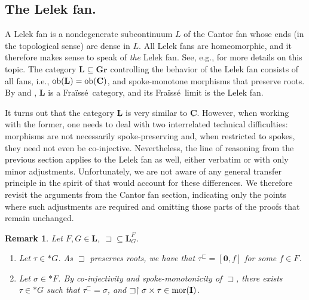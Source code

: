 \documentclass[12pt]{amsart}
\numberwithin{equation}{section}
\theoremstyle{plain}
\newtheorem{remark}[theorem]{\bf Remark}
\theoremstyle{definition}
\newcommand \sqsp{\sqsupset}
\newcommand \sqsb{\sqsubset}
\newcommand \mor{{\rm{mor}}}
\newcommand \ob{{\rm{ob}}}
\newcommand \rt{\mathbf{0}}
\newcommand \fra{Fra\"{i}ss\'{e}}
\newcommand \uhr{\upharpoonright}
\newcommand \CCb{\mathbf{C}}
\newcommand \GGRb{\mathbf{Gr}}
\newcommand \IIb{\mathbf{I}}
\newcommand \LLb{\mathbf{L}}
\newcommand \CCub{\underline{\mathbf{C}}}
\newcommand \LLub{\underline{\mathbf{L}}}
\begin{document}
\subsection{The Lelek fan.} 

 A Lelek fan is a nondegenerate subcontinuum $L$ of the Cantor fan whose ends (in the topological sense) are dense in $L$. All Lelek fans are homeomorphic, and it therefore makes sense to speak of \emph{the} Lelek fan. See, e.g., \cite{BaBiVi2} for more details on this topic. The category $\LLb \subseteq \GGRb$ controlling the behavior of the Lelek fan consists of all fans, i.e., $\ob(\LLb)=\ob(\CCb)$, and spoke-monotone morphisms that preserve roots. By \cite[Proposition 5.29]{BaBiVi2} and \cite[Theorem 5.43]{BaBiVi2}, $\LLb$ is a \fra \ category, and its \fra \ limit is the Lelek fan. 
 
It turns out that the category $\LLub$ is very similar to $\CCub$. However, when working with the former, one needs to deal with two interrelated technical difficulties: morphisms are not necessarily spoke-preserving and, when restricted to spokes, they need not even be co-injective. Nevertheless, the line of reasoning from the previous section applies to the Lelek fan as well, either verbatim or with only minor adjustments. Unfortunately, we are not aware of any general transfer principle in the spirit of \cite[Section~3.1]{BaKuKwMa} that would account for these differences. We therefore revisit the arguments from the Cantor fan section, indicating only the points where such adjustments are required and omitting those parts of the proofs that remain unchanged.
 
 \begin{remark}
 	Let $F, G \in \LLb$, ${\sqsp} \subseteq \LLb^F_G$.
 	\begin{enumerate}
 		\item Let $\tau \in *G$. As $\sqsp$ preserves roots, we have that $\tau^\sqsb=[\rt,f]$ for some $f \in F$. 
 		\item Let $\sigma \in *F$. By co-injectivity and spoke-monotonicity of $\sqsp$, there exists $\tau \in *G$ such that $\tau^\sqsb=\sigma$, and $\sqsp \uhr \sigma \times \tau \in \mor(\IIb)$.
 	\end{enumerate}
 \end{remark}
 
\end{document}
